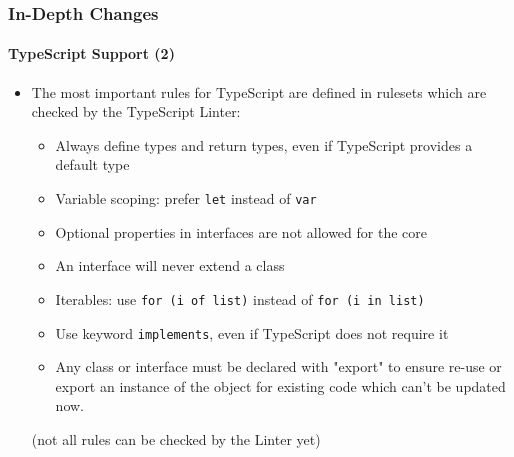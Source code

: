 \begin{frame}[fragile]
	\frametitle{In-Depth Changes}
	\framesubtitle{TypeScript Support (2)}

	\begin{itemize}
		\item The most important rules for TypeScript are defined in rulesets which are checked by the TypeScript Linter:

			\begin{itemize}
				\item Always define types and return types, even if TypeScript provides a default type
				\item Variable scoping: prefer \texttt{let} instead of \texttt{var}
				\item Optional properties in interfaces are not allowed for the core
				\item An interface will never extend a class
				\item Iterables: use \texttt{for (i of list)} instead of \texttt{for (i in list)}
				\item Use keyword \texttt{implements}, even if TypeScript does not require it
				\item Any class or interface must be declared with "export" to ensure re-use or export an instance of the object for existing code which can't be updated now.
			\end{itemize}

			\small(not all rules can be checked by the Linter yet)\normalsize

	\end{itemize}

\end{frame}



